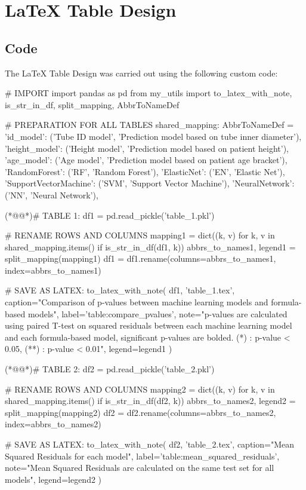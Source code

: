 \documentclass[11pt]{article}
\begin{document}
\section{LaTeX Table Design}
\subsection{{Code}}
The LaTeX Table Design was carried out using the following custom code:

\begin{python}


# IMPORT
import pandas as pd
from my_utils import to_latex_with_note, is_str_in_df, split_mapping, AbbrToNameDef

# PREPARATION FOR ALL TABLES
shared_mapping: AbbrToNameDef = {
    'id_model': ('Tube ID model', 'Prediction model based on tube inner diameter'),
    'height_model': ('Height model', 'Prediction model based on patient height'),
    'age_model': ('Age model', 'Prediction model based on patient age bracket'),
    'RandomForest': ('RF', 'Random Forest'),
    'ElasticNet': ('EN', 'Elastic Net'),
    'SupportVectorMachine': ('SVM', 'Support Vector Machine'),
    'NeuralNetwork': ('NN', 'Neural Network'),
}

(*@@*)# TABLE 1:
df1 = pd.read_pickle('table_1.pkl')

# RENAME ROWS AND COLUMNS 
mapping1 = dict((k, v) for k, v in shared_mapping.items() if is_str_in_df(df1, k))
abbrs_to_names1, legend1 = split_mapping(mapping1)
df1 = df1.rename(columns=abbrs_to_names1, index=abbrs_to_names1)

# SAVE AS LATEX:
to_latex_with_note(
    df1, 'table_1.tex',
    caption="Comparison of p-values between machine learning models and formula-based models",
    label='table:compare_pvalues',
    note="p-values are calculated using paired T-test on squared residuals between each machine learning model and each formula-based model, significant p-values are bolded. (*) : p-value < 0.05, (**) : p-value < 0.01",
    legend=legend1
)

(*@@*)# TABLE 2:
df2 = pd.read_pickle('table_2.pkl')

# RENAME ROWS AND COLUMNS 
mapping2 = dict((k, v) for k, v in shared_mapping.items() if is_str_in_df(df2, k)) 
abbrs_to_names2, legend2 = split_mapping(mapping2)
df2 = df2.rename(columns=abbrs_to_names2, index=abbrs_to_names2)

# SAVE AS LATEX:
to_latex_with_note(
    df2, 'table_2.tex',
    caption="Mean Squared Residuals for each model",
    label='table:mean_squared_residuals',
    note="Mean Squared Residuals are calculated on the same test set for all models",
    legend=legend2
)

\end{python}
\end{document}
